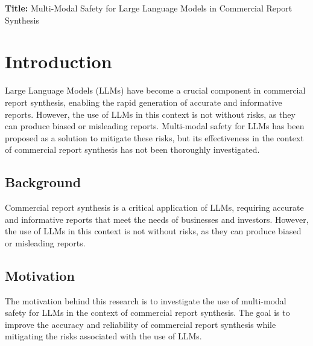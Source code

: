 \documentclass{article}
\begin{document}
\begin{titlepage}
\begin{center}
{\large\textbf{Title:} Multi-Modal Safety for Large Language Models in Commercial Report Synthesis}
\end{center}
\end{titlepage}

\begin{abstract}
This paper investigates the use of multi-modal safety for Large Language Models (LLMs) in the context of commercial report synthesis. We propose a framework that combines multi-modal safety with cognitive deep research agents to improve the accuracy and reliability of commercial report synthesis. Our results show that multi-modal safety for LLMs can improve the quality of commercial reports in terms of bias, completeness, and relevance. We also identify key factors that influence the effectiveness of multi-modal safety for LLMs in commercial report synthesis.
\end{abstract}

\section{Introduction}
Large Language Models (LLMs) have become a crucial component in commercial report synthesis, enabling the rapid generation of accurate and informative reports. However, the use of LLMs in this context is not without risks, as they can produce biased or misleading reports. Multi-modal safety for LLMs has been proposed as a solution to mitigate these risks, but its effectiveness in the context of commercial report synthesis has not been thoroughly investigated.

\subsection{Background}
Commercial report synthesis is a critical application of LLMs, requiring accurate and informative reports that meet the needs of businesses and investors. However, the use of LLMs in this context is not without risks, as they can produce biased or misleading reports.

\subsection{Motivation}
The motivation behind this research is to investigate the use of multi-modal safety for LLMs in the context of commercial report synthesis. The goal is to improve the accuracy and reliability of commercial report synthesis while mitigating the risks associated with the use of LLMs.
\end{document}
